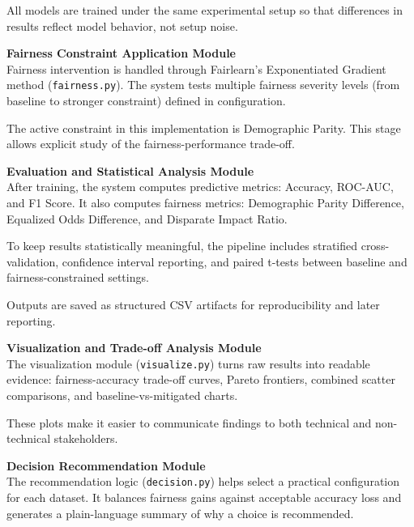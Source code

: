 All models are trained under the same experimental setup so that differences in results reflect model behavior, not setup noise.

\vspace{0.5em}

\textbf{Fairness Constraint Application Module} \\
Fairness intervention is handled through Fairlearn’s Exponentiated Gradient method (\texttt{fairness.py}). The system tests multiple fairness severity levels (from baseline to stronger constraint) defined in configuration.

The active constraint in this implementation is Demographic Parity. This stage allows explicit study of the fairness-performance trade-off.

\vspace{0.5em}

\textbf{Evaluation and Statistical Analysis Module} \\
After training, the system computes predictive metrics: Accuracy, ROC-AUC, and F1 Score. It also computes fairness metrics: Demographic Parity Difference, Equalized Odds Difference, and Disparate Impact Ratio.

To keep results statistically meaningful, the pipeline includes stratified cross-validation, confidence interval reporting, and paired t-tests between baseline and fairness-constrained settings.

Outputs are saved as structured CSV artifacts for reproducibility and later reporting.

\vspace{0.5em}

\textbf{Visualization and Trade-off Analysis Module} \\
The visualization module (\texttt{visualize.py}) turns raw results into readable evidence: fairness-accuracy trade-off curves, Pareto frontiers, combined scatter comparisons, and baseline-vs-mitigated charts.

These plots make it easier to communicate findings to both technical and non-technical stakeholders.

\vspace{0.5em}

\textbf{Decision Recommendation Module} \\
The recommendation logic (\texttt{decision.py}) helps select a practical configuration for each dataset. It balances fairness gains against acceptable accuracy loss and generates a plain-language summary of why a choice is recommended.

